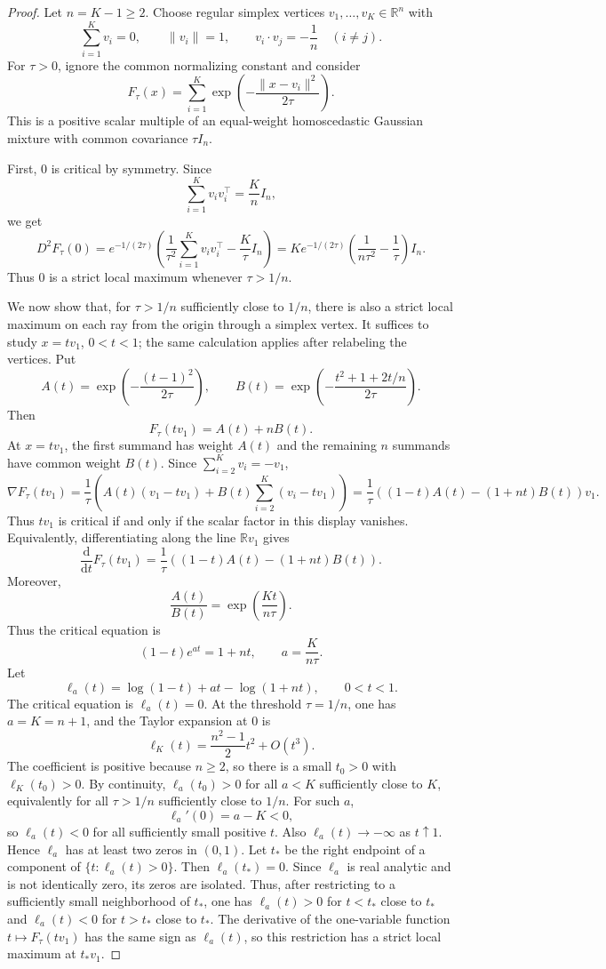\documentclass[11pt]{article}
\theoremstyle{plain}
\theoremstyle{definition}
\theoremstyle{remark}
\numberwithin{equation}{section}
\newcommand{\R}{\mathbb{R}}
\begin{document}
\begin{proof}
Let $n=K-1\ge2$. Choose regular simplex vertices $v_1,\dots,v_K\in\R^n$ with
\[
\sum_{i=1}^K v_i=0,
\qquad
\|v_i\|=1,
\qquad
v_i\cdot v_j=-\frac1n\quad(i\ne j).
\]
For $\tau>0$, ignore the common normalizing constant and consider
\[
F_\tau(x)=\sum_{i=1}^K \exp\left(-\frac{\|x-v_i\|^2}{2\tau}\right).
\]
This is a positive scalar multiple of an equal-weight homoscedastic Gaussian mixture with common covariance $\tau I_n$.

First, $0$ is critical by symmetry. Since
\[
\sum_{i=1}^K v_iv_i^\top=\frac{K}{n}I_n,
\]
we get
\[
D^2F_\tau(0)=e^{-1/(2\tau)}
\left(\frac1{\tau^2}\sum_{i=1}^K v_iv_i^\top-\frac{K}{\tau}I_n\right)
=K e^{-1/(2\tau)}\left(\frac{1}{n\tau^2}-\frac1\tau\right)I_n.
\]
Thus $0$ is a strict local maximum whenever $\tau>1/n$.

We now show that, for $\tau>1/n$ sufficiently close to $1/n$, there is also a strict local maximum on each ray from the origin through a simplex vertex. It suffices to study $x=t v_1$, $0<t<1$; the same calculation applies after relabeling the vertices. Put
\[
A(t)=\exp\left(-\frac{(t-1)^2}{2\tau}\right),
\qquad
B(t)=\exp\left(-\frac{t^2+1+2t/n}{2\tau}\right).
\]
Then
\[
F_\tau(tv_1)=A(t)+nB(t).
\]
At $x=tv_1$, the first summand has weight $A(t)$ and the remaining $n$ summands have common weight $B(t)$. Since $\sum_{i=2}^K v_i=-v_1$,
\[
\nabla F_\tau(tv_1)=\frac1\tau\left(A(t)(v_1-tv_1)+B(t)\sum_{i=2}^K(v_i-tv_1)\right)
=\frac1\tau\left((1-t)A(t)-(1+nt)B(t)\right)v_1.
\]
Thus $t v_1$ is critical if and only if the scalar factor in this display vanishes. Equivalently, differentiating along the line $\R v_1$ gives
\[
\frac{\mathrm d}{\mathrm dt}F_\tau(tv_1)=\frac1\tau\left((1-t)A(t)-(1+nt)B(t)\right).
\]
Moreover,
\[
\frac{A(t)}{B(t)}=\exp\left(\frac{Kt}{n\tau}\right).
\]
Thus the critical equation is
\[
(1-t)e^{at}=1+nt,
\qquad
 a=\frac{K}{n\tau}.
\]
Let
\[
\ell_a(t)=\log(1-t)+at-\log(1+nt),
\qquad 0<t<1.
\]
The critical equation is $\ell_a(t)=0$. At the threshold $\tau=1/n$, one has $a=K=n+1$, and the Taylor expansion at $0$ is
\[
\ell_K(t)=\frac{n^2-1}{2}t^2+O(t^3).
\]
The coefficient is positive because $n\ge2$, so there is a small $t_0>0$ with $\ell_K(t_0)>0$. By continuity, $\ell_a(t_0)>0$ for all $a<K$ sufficiently close to $K$, equivalently for all $\tau>1/n$ sufficiently close to $1/n$. For such $a$,
\[
\ell_a'(0)=a-K<0,
\]
so $\ell_a(t)<0$ for all sufficiently small positive $t$. Also $\ell_a(t)\to-\infty$ as $t\uparrow1$. Hence $\ell_a$ has at least two zeros in $(0,1)$. Let $t_\ast$ be the right endpoint of a component of $\{t:\ell_a(t)>0\}$. Then $\ell_a(t_\ast)=0$. Since $\ell_a$ is real analytic and is not identically zero, its zeros are isolated. Thus, after restricting to a sufficiently small neighborhood of $t_\ast$, one has $\ell_a(t)>0$ for $t<t_\ast$ close to $t_\ast$ and $\ell_a(t)<0$ for $t>t_\ast$ close to $t_\ast$. The derivative of the one-variable function $t\mapsto F_\tau(tv_1)$ has the same sign as $\ell_a(t)$, so this restriction has a strict local maximum at $t_\ast v_1$.


\end{proof}
\end{document}
